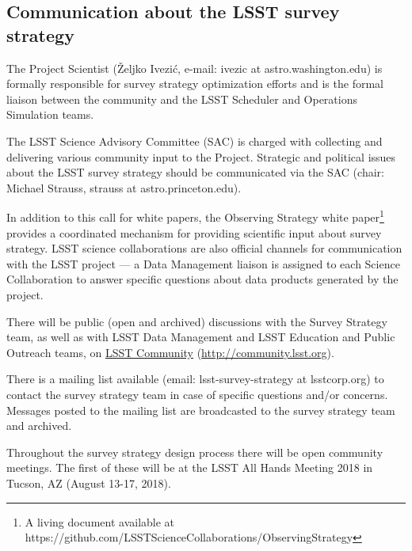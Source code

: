 \documentclass[DM,lsstdraft,toc,usenatbib]{lsstdoc}
\begin{document}
\subsection{Communication about the LSST survey strategy} 

The Project Scientist (\v{Z}eljko Ivezi\'{c}, e-mail: ivezic at astro.washington.edu) is formally responsible for survey strategy optimization efforts and is the formal liaison between the community and the LSST Scheduler and Operations Simulation teams.

The LSST Science Advisory Committee (SAC) is charged with collecting and delivering various community input to the Project. Strategic and political issues about the LSST survey strategy should be communicated via the SAC (chair: Michael Strauss, strauss at astro.princeton.edu).

In addition to this call for white papers, the Observing Strategy white paper\footnote{A living document available at https://github.com/LSSTScienceCollaborations/ObservingStrategy} provides a coordinated mechanism for providing scientific input about survey strategy. LSST science collaborations are also official channels for communication with the LSST project --- a Data Management liaison is assigned to each Science Collaboration to answer specific questions about data products generated by the project.

There will be public (open and archived) discussions with the Survey Strategy team, as well as with LSST Data Management 
and LSST Education and Public Outreach teams, on \href{http://community.lsst.org}{LSST Community} (\url{http://community.lsst.org}). 

There is a mailing list available (email: lsst-survey-strategy at lsstcorp.org) to contact the survey strategy team in case of specific 
questions and/or concerns. Messages posted to the mailing list are broadcasted to the survey strategy team and archived. 

Throughout the survey strategy design process there will be open community meetings. The first of these will be 
at the LSST All Hands Meeting 2018 in Tucson, AZ (August 13-17, 2018). 
\end{document}
